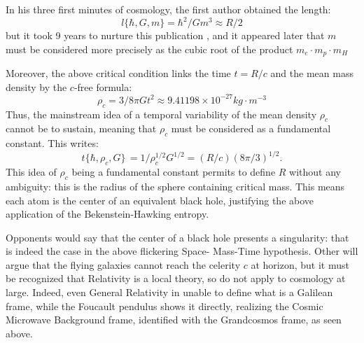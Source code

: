 \documentclass[twoside,draft]{article}
\begin{document}
\begin{sloppypar}
In his three first minutes of cosmology, the first author obtained the length:
\begin{equation}
l \{\hbar,G,m\} = \hbar^{2} /Gm^{3} \approx R/2
\end{equation}
but it took 9 years to nurture this publication \cite{Sanchez3}, and it appeared later \cite{Sanchez1} that $m$ must be considered more precisely as the cubic root of the product 
$
m_{e} \cdot m_{p} \cdot m_{H}$

Moreover, the above critical condition
links the time $t = R/c$ and the mean mass density by the $c$-free formula:
\begin{equation}
\rho_{c} = 3/8\pi Gt^{2} \approx 9.41198 \times 10^{-27} kg \cdot m^{-3}
\end{equation}
Thus, the mainstream idea of a temporal variability of the mean density $\rho_{c}$ cannot be to
sustain, meaning that $\rho_{c}$ must be considered as a fundamental constant. This writes:
\begin{equation}
t\{\hbar,\rho_{c} ,G\}\, = 1/\rho_{c}^{1/2} G^{1/2} = (R/c) (8\pi/3)^{1/2}.
\end{equation}
This idea of $\rho_{c}$ being a fundamental constant permits to define $R$ without any ambiguity: this is the 
radius of the sphere containing critical mass. This means each atom is the center of an equivalent black hole,
justifying the above application of the Bekenstein-Hawking entropy. 

Opponents would say that the
center of a black hole presents a singularity: that is indeed the case in the above flickering Space-
Mass-Time hypothesis. Other will argue that the flying galaxies cannot reach the celerity $c$ at
horizon, but it must be recognized that Relativity is a local theory, so do not apply to cosmology at large.
Indeed, even General Relativity in unable to define what is a Galilean frame, while the Foucault
pendulus shows it directly, realizing the Cosmic Microwave Background frame, identified with the
Grandcosmos frame, as seen above.


\end{sloppypar}
\end{document}
